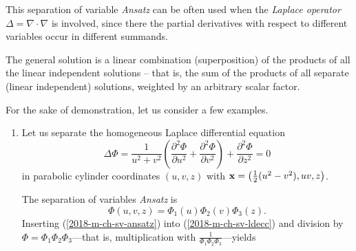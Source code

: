 This separation of variable {\it Ansatz}
can be often used when the
{\em Laplace operator}
$\Delta=\nabla  \cdot \nabla$
is involved, since there the partial derivatives with respect to different variables
occur in different summands.

The general solution
is a linear combination (superposition) of the products of all the linear independent solutions --
that is, the sum of the products of all separate (linear independent) solutions, weighted by an arbitrary scalar factor.

{
\color{blue}
\bexample

For the sake of demonstration, let us consider a few examples.

\begin{enumerate}
\item
Let us separate the homogeneous Laplace differential equation
\begin{equation}
\Delta \Phi =\frac{1}{u^2+v^2}
  \left(
    \frac{\partial^2\Phi}{\partial u^2}+
    \frac{\partial^2\Phi}{\partial v^2}
  \right)+
  \frac{\partial^2\Phi}{\partial z^2}
= 0
\label{2018-m-ch-sv-ldecc}
\end{equation}
in parabolic
cylinder coordinates $(u,v,z)$ with
${\bf x} = \left({1 \over 2} (u^2 - v^2), uv, z\right) $.


The separation of variables {\it Ansatz} is
\begin{equation}
\Phi(u,v,z)=\Phi_1(u)\Phi_2(v)\Phi_3(z).
\label{2018-m-ch-sv-ansatz}
\end{equation}
Inserting (\ref{2018-m-ch-sv-ansatz}) into (\ref{2018-m-ch-sv-ldecc}) and
division by $\Phi=\Phi_1\Phi_2\Phi_3$---that is, multiplication with $\frac{1}{\Phi_1 \Phi_2 \Phi_3 }$---yields


\end{enumerate}}
